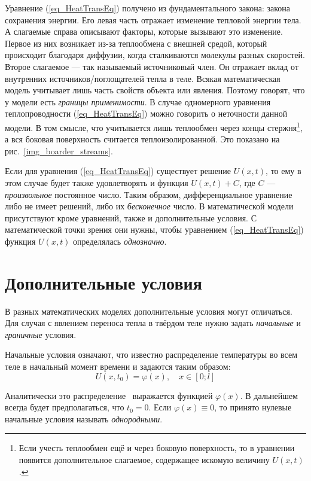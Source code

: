 \documentclass[oneside, final, 14pt]{report}
\begin{document}
Уравнение (\ref{eq_HeatTransEq}) получено из фундаментального закона: закона сохранения энергии. Его левая часть отражает изменение тепловой энергии тела. А слагаемые справа описывают факторы, которые вызывают это изменение. Первое из них возникает из-за теплообмена с внешней средой, который происходит благодаря диффузии, когда сталкиваются молекулы разных скоростей. Второе слагаемое --- так называемый источниковый член. Он отражает вклад от внутренних источников/поглощателей тепла в теле. Всякая математическая модель учитывает лишь часть свойств объекта или явления. Поэтому говорят, что у модели есть \emph{границы применимости}. В случае одномерного уравнения теплопроводности (\ref{eq_HeatTransEq}) можно говорить о неточности данной модели. В том смысле, что учитывается лишь теплообмен через концы стержня\footnote{Если учесть теплообмен ещё и через боковую поверхность, то в уравнении появится дополнительное слагаемое, содержащее искомую величину $U(x, t)$.}, а вся боковая поверхность считается теплоизолированной. Это показано на рис.~\ref{img_boarder_streams}. 


Если для уравнения (\ref{eq_HeatTransEq}) существует решение $U(x, t)$, то ему в этом случае будет также удовлетворять и функция $U(x, t) + C$, где $C$ --- \emph{произвольное} постоянное число. Таким образом, дифференциальное уравнение либо не имеет решений, либо их \emph{бесконечное} число.
В математической модели присутствуют кроме уравнений, также и дополнительные условия. С математической точки зрения они нужны, чтобы уравнением (\ref{eq_HeatTransEq}) функция $U(x, t)$ определялась \emph{однозначно}. 
\section{Дополнительные условия}
В разных математических моделях дополнительные условия могут отличаться. Для случая с явлением переноса тепла в твёрдом теле
нужно задать \emph{начальные} и \emph{граничные} условия. 


Начальные условия означают, что известно распределение температуры во всем теле в начальный момент времени и задаются таким образом:
\begin{equation}
U(x,t_0) = \varphi(x), \quad x \in [0; l] \label{eq_SstartCond}                              
\end{equation}

Аналитически это распределение ~выражается функцией $\varphi(x)$. В дальнейшем всегда будет предполагаться, что $t_0 = 0$. Если $\varphi(x) \equiv 0$, то принято нулевые начальные условия называть \emph{однородными}. 
\end{document}
